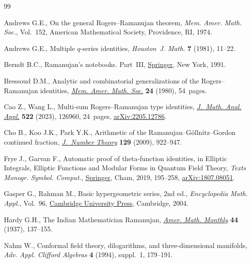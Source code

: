 \documentclass[10pt,a4paper]{amsart}
\numberwithin{equation}{section}
\theoremstyle{definition}
\begin{document}
\begin{thebibliography}{99}
\footnotesize\itemsep=0pt

Andrews G.E., On the general {R}ogers--{R}amanujan theorem, \textit{Mem. Amer.
 Math. Soc.}, Vol.~152, American Mathematical Society, Providence, RI, 1974.

Andrews G.E., Multiple {$q$}-series identities, \textit{Houston~J. Math.}
 \textbf{7} (1981), 11--22.

Berndt B.C., Ramanujan's notebooks. {P}art~{III},
 \href{https://doi.org/10.1007/978-1-4612-0965-2}{Springer}, New York, 1991.

Bressoud D.M., Analytic and combinatorial generalizations of the
 {R}ogers--{R}amanujan identities,
 \href{https://doi.org/10.1090/memo/0227}{\textit{Mem. Amer. Math. Soc.}}
 \textbf{24} (1980), 54~pages.

Cao Z., Wang L., Multi-sum {R}ogers--{R}amanujan type identities,
 \href{https://doi.org/10.1016/j.jmaa.2022.126960}{\textit{J.~Math. Anal.
 Appl.}} \textbf{522} (2023), 126960, 24~pages,
 \href{http://arxiv.org/abs/2205.12786}{arXiv:2205.12786}.

Cho B., Koo J.K., Park Y.K., Arithmetic of the
 {R}amanujan--{G}\"{o}llnitz--{G}ordon continued fraction,
 \href{https://doi.org/10.1016/j.jnt.2008.09.018}{\textit{J.~Number Theory}}
 \textbf{129} (2009), 922--947.

Frye J., Garvan F., Automatic proof of theta-function identities, in Elliptic Integrals, Elliptic Functions and Modular Forms in Quantum Field Theory,
 \textit{Texts Monogr. Symbol. Comput.},
 \href{https://doi.org/10.1007/978-3-030-04480-0_10}{Springer}, Cham, 2019,
 195--258, \href{http://arxiv.org/abs/1807.08051}{arXiv:1807.08051}.

Gasper G., Rahman M., Basic hypergeometric series, 2nd ed., \textit{Encyclopedia Math.
 Appl.}, Vol.~96,
 \href{https://doi.org/10.1017/CBO9780511526251}{Cambridge University Press},
 Cambridge, 2004.

Hardy G.H., The {I}ndian {M}athematician {R}amanujan,
 \href{https://doi.org/10.2307/2301659}{\textit{Amer. Math. Monthly}}
 \textbf{44} (1937), 137--155.

Nahm W., Conformal field theory, dilogarithms, and three-dimensional manifolds,
 \textit{Adv. Appl. Clifford Algebras} \textbf{4} (1994), suppl.~1, 179--191.


\end{thebibliography}
\end{document}

